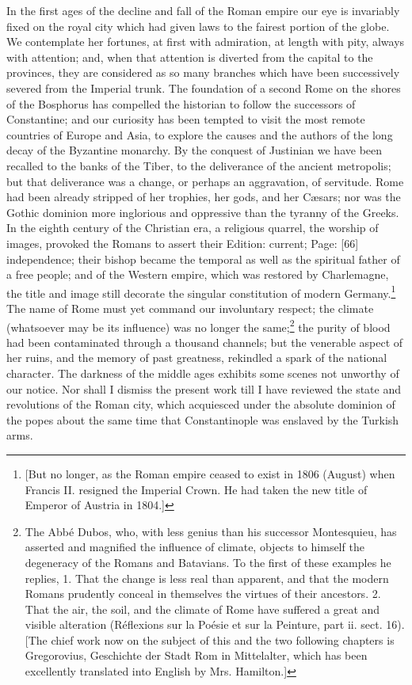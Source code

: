 In the first ages of the decline and fall of the Roman empire our eye is invariably fixed on the royal city which had given laws to the fairest portion of the globe. We contemplate her fortunes, at first with admiration, at length with pity, always with attention; and, when that attention is diverted from the capital to the provinces, they are considered as so many branches which have been successively severed from the Imperial trunk. The foundation of a second Rome on the shores of the Bosphorus has compelled the historian to follow the successors of Constantine; and our curiosity has been tempted to visit the most remote countries of Europe and Asia, to explore the causes and the authors of the long decay of the Byzantine monarchy. By the conquest of Justinian we have been recalled to the banks of the Tiber, to the deliverance of the ancient metropolis; but that deliverance was a change, or perhaps an aggravation, of servitude. Rome had been already stripped of her trophies, her gods, and her Cæsars; nor was the Gothic dominion more inglorious and oppressive than the tyranny of the Greeks. In the eighth century of the Christian era, a religious quarrel, the worship of images, provoked the Romans to assert their Edition: current; Page: [66] independence; their bishop became the temporal as well as the spiritual father of a free people; and of the Western empire, which was restored by Charlemagne, the title and image still decorate the singular constitution of modern Germany.\footnote{[But no longer, as the Roman empire ceased to exist in 1806 (August) when Francis II. resigned the Imperial Crown. He had taken the new title of Emperor of Austria in 1804.]} The name of Rome must yet command our involuntary respect; the climate (whatsoever may be its influence) was no longer the same;\footnote{The Abbé Dubos, who, with less genius than his successor Montesquieu, has asserted and magnified the influence of climate, objects to himself the degeneracy of the Romans and Batavians. To the first of these examples he replies, 1. That the change is less real than apparent, and that the modern Romans prudently conceal in themselves the virtues of their ancestors. 2. That the air, the soil, and the climate of Rome have suffered a great and visible alteration (Réflexions sur la Poésie et sur la Peinture, part ii. sect. 16). [The chief work now on the subject of this and the two following chapters is Gregorovius, Geschichte der Stadt Rom in Mittelalter, which has been excellently translated into English by Mrs. Hamilton.]} the purity of blood had been contaminated through a thousand channels; but the venerable aspect of her ruins, and the memory of past greatness, rekindled a spark of the national character. The darkness of the middle ages exhibits some scenes not unworthy of our notice. Nor shall I dismiss the present work till I have reviewed the state and revolutions of the Roman city, which acquiesced under the absolute dominion of the popes about the same time that Constantinople was enslaved by the Turkish arms.

